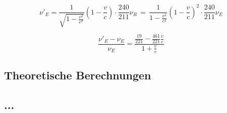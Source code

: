 \documentclass[a4paper,10pt]{article}
\begin{document}
\begin{equation}
 \nu'_E = \frac{1}{\sqrt{1-\frac{v^2}{c^2}}}(1-\frac{v}{c}) \cdot \frac{240}{211}\nu_R \, = \, \frac{1}{1-\frac{v^2}{c^2}}(1-\frac{v}{c})^2 \cdot \frac{240}{211} \nu_E
\end{equation}

\begin{equation}
 \frac{\nu'_E-\nu_E}{\nu_E} = \frac{\frac{19}{221}- \frac{461}{221}\frac{v}{c}}{1+\frac{v}{c}}
\end{equation}


\subsection{Theoretische Berechnungen}
\subsection{...}
\end{document}
